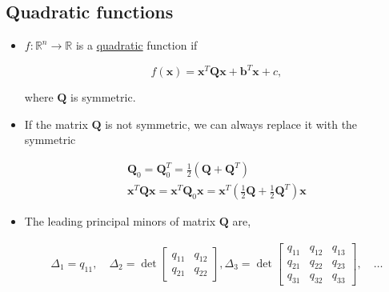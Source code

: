 \documentclass[12pt,thmsa]{article}
\begin{document}
\subsection{Quadratic functions}
\begin{itemize}
	\item \(f: \mathbb{R}^{n} \rightarrow \mathbb{R}\) is a \underline{quadratic} function if

	\begin{equation*}
		f(\boldsymbol{x})=\boldsymbol{x}^{T} \boldsymbol{Q} \boldsymbol{x}+\boldsymbol{b}^{T} \boldsymbol{x}+c,
	\end{equation*}
	
	where \(\boldsymbol{Q}\) is {\color{red}symmetric}.
	
	\item If the matrix \(\boldsymbol{Q}\) is not symmetric, we can always replace it with the symmetric
	
	\begin{equation*}
		\begin{gathered}
			\boldsymbol{Q}_{0}=\boldsymbol{Q}_{0}^{T}=\frac{1}{2}\left(\boldsymbol{Q}+\boldsymbol{Q}^{T}\right) \\
			\boldsymbol{x}^{T} \boldsymbol{Q} \boldsymbol{x}=\boldsymbol{x}^{T} \boldsymbol{Q}_{0} \boldsymbol{x}=\boldsymbol{x}^{T}\left(\frac{1}{2} \boldsymbol{Q}+\frac{1}{2} \boldsymbol{Q}^{T}\right) \boldsymbol{x}
		\end{gathered}
	\end{equation*}
	
	\item The leading principal minors of matrix \(\boldsymbol{Q}\) are,

	\begin{equation*}
		\begin{gathered}
			\Delta_{1}=q_{11}, \quad \Delta_{2}=\operatorname{det}\left[\begin{array}{ll}
				q_{11} & q_{12} \\
				q_{21} & q_{22}
			\end{array}\right], 
			\Delta_{3}=\operatorname{det}\left[\begin{array}{lll}
				q_{11} & q_{12} & q_{13} \\
				q_{21} & q_{22} & q_{23} \\
				q_{31} & q_{32} & q_{33}
			\end{array}\right], \quad \ldots
		\end{gathered}
	\end{equation*}


\end{itemize}
\end{document}
